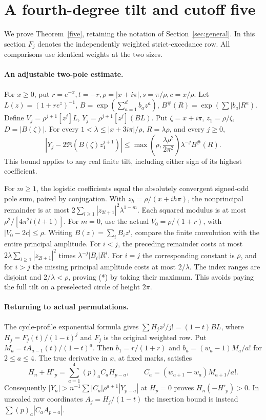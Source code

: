 \section{A fourth-degree tilt and cutoff five}\label{sec:five}
We prove Theorem~\ref{five}, retaining the notation of Section~\ref{sec:general}. In this section \(F_j\) denotes the independently weighted strict-excedance row. All comparisons use identical weights at the two sizes.
\paragraph{An adjustable two-pole estimate.}

For \(x\ge0\), put \(r=e^{-x},t=-r,\rho=|x+i\pi|,s=\pi/\rho,c=x/\rho\). Let \(L(z)=(1+r e^z)^{-1}\), \(B=\exp(\sum_{a=1}^d b_a z^a)\), \(B^\#(R)=\exp(\sum |b_a|R^a)\). Define \(V_j=\rho^{j+1}[z^j]L\), \(Y_j=\rho^{j+1}[z^j](BL)\). Put \(\zeta=x+i\pi\), \(z_1=\rho/\zeta\), \(D=|B(\zeta)|\). For every \(1<\lambda\le |x+3i\pi|/\rho\), \(R=\lambda\rho\), and every \(j\ge0\),
\[
 |Y_j-2\Re(B(\zeta)z_1^{j+1})|
 \le \max\!\left(\rho,\frac{\lambda\rho^2}{2\pi^2}\right)\lambda^{-j} B^\#(R).                 \tag{*}
\]
This bound applies to any real finite tilt, including either sign of its highest coefficient.

For \(m\ge1\), the logistic coefficients equal the absolutely convergent signed-odd pole sum, paired by conjugation. With \(z_h=\rho/(x+ih\pi)\), the nonprincipal remainder is at most \(2\sum_{l\ge1}|z_{2l+1}|^2\lambda^{1-m}\). Each squared modulus is at most \(\rho^2/[4\pi^2 l(l+1)]\). For \(m=0\), use the actual \(V_0=\rho/(1+r)\), with \(|V_0-2c|\le\rho\). Writing \(B(z)=\sum_i B_i z^i\), compare the finite convolution with the entire principal amplitude. For \(i<j\), the preceding remainder costs at most \(2\lambda\sum_{l\ge1}|z_{2l+1}|^2\) times \(\lambda^{-j}|B_i|R^i\). For \(i=j\) the corresponding constant is \(\rho\), and for \(i>j\) the missing principal amplitude costs at most \(2/\lambda\). The index ranges are disjoint and \(2/\lambda<\rho\), proving (*) by taking their maximum. This avoids paying the full tilt on a preselected circle of height \(2\pi\).

\paragraph{Returning to actual permutations.}

The cycle-profile exponential formula gives \(\sum H_j z^j/j!=(1-t)BL\), where \(H_j=F_j(t)/(1-t)^j\) and \(F_j\) is the original weighted row. Put \(M_a=t A_{a-1}(t)/(1-t)^a\). Then \(b_1=r/(1+r)\) and \(b_a=(w_a-1)M_a/a!\) for \(2\le a\le4\). The true derivative in \(x\), at fixed marks, satisfies
\[
H_n+H'_p=\sum_{a=1}^{4}(p)_a C_a H_{p-a},\qquad C_a=(w_{a+1}-w_a) M_{a+1}/a!.
\]
Consequently \(|Y_n|>n^{-1}\sum|C_a|\rho^{a+1}|Y_{p-a}|\) at \(H_p=0\) proves \(H_n(-H'_p)>0\). In unscaled raw coordinates \(A_j=H_j/(1-t)\) the insertion bound is instead \(\sum(p)_a|C_a A_{p-a}|\).

